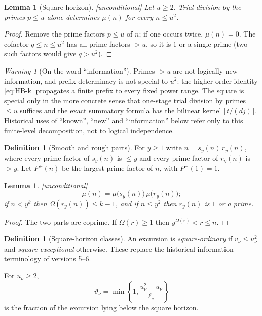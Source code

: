 \documentclass[11pt]{amsart}
\numberwithin{equation}{section}
\theoremstyle{plain}
\newtheorem{lemma}[theorem]{Lemma}
\theoremstyle{definition}
\newtheorem{definition}[theorem]{Definition}
\theoremstyle{remark}
\newtheorem{warning}[theorem]{Warning}
\newcommand{\Pp}{P^{+}}
\begin{document}
\begin{lemma}[Square horizon]
\label{lem:square-horizon}
\emph{[unconditional]} Let $u\ge2$. Trial division by the primes $p\le u$
alone determines $\mu(n)$ for every $n\le u^2$.
\end{lemma}

\begin{proof}
Remove the prime factors $p\le u$ of $n$; if one occurs twice, $\mu(n)=0$.
The cofactor $q\le n\le u^2$ has all prime factors $>u$, so it is $1$ or a
single prime (two such factors would give $q>u^2$).
\end{proof}

\begin{warning}[On the word ``information'']
\label{warn:information_language}
Primes $>u$ are not logically new information, and prefix determinacy is not
special to $u^2$: the higher-order identity \eqref{eq:HB-k} propagates a
finite prefix to every fixed power range.  The square is special only in the
more concrete sense that one-stage trial division by primes $\le u$ suffices
and the exact summatory formula has the bilinear kernel
$\lfloor t/(dj)\rfloor$.  Historical uses of ``known'', ``new'' and
``information'' below refer only to this finite-level decomposition, not to
logical independence.
\end{warning}

\begin{definition}[Smooth and rough parts]
\label{def:smooth_rough}
For $y\ge1$ write $n=s_y(n)\,r_y(n)$, where every prime factor of $s_y(n)$
is $\le y$ and every prime factor of $r_y(n)$ is $>y$. Let $\Pp(n)$ be the
largest prime factor of $n$, with $\Pp(1)=1$.
\end{definition}

\begin{lemma}
\label{lem:rough_part}
\emph{[unconditional]}
\begin{equation}
\label{eq:mu_split}
  \mu(n)=\mu\bigl(s_y(n)\bigr)\,\mu\bigl(r_y(n)\bigr);
\end{equation}
if $n<y^k$ then $\Omega(r_y(n))\le k-1$, and if $n\le y^2$ then $r_y(n)$ is
$1$ or a prime.
\end{lemma}

\begin{proof}
The two parts are coprime. If $\Omega(r)\ge1$ then $y^{\Omega(r)}<r\le n$.
\end{proof}

\begin{definition}[Square-horizon classes]
\label{def:info-excursion}
An excursion is \emph{square-ordinary} if $v_\nu\le u_\nu^2$ and
\emph{square-exceptional} otherwise. These replace the historical information terminology of versions 5--6.\par
For $u_\nu\ge2$,
\[
\vartheta_\nu=\min\left\{1,\frac{u_\nu^2-u_\nu}{\ell_\nu}\right\}
\]
is the fraction of the excursion lying below the square horizon.
\end{definition}
\end{document}
